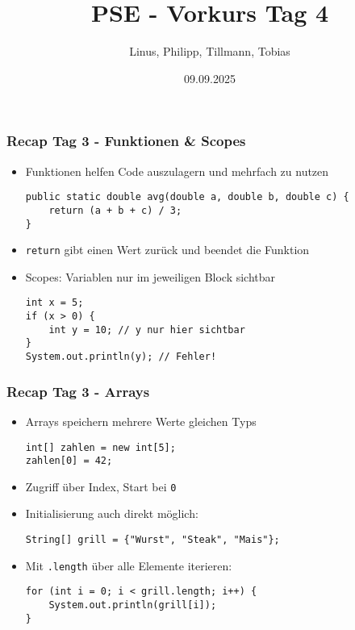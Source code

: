 \documentclass{../../presentation}
\title{PSE - Vorkurs Tag 4}
\author{Linus, Philipp, Tillmann, Tobias}
\institute{FIUS - Fachgruppe Informatik Universität Stuttgart}
\date{09.09.2025}
\begin{document}
\begin{frame}
	\titlepage
\end{frame}

\begin{frame}[fragile]
	\frametitle{Recap Tag 3 - Funktionen \& Scopes}

	\begin{itemize}
		\item\pause Funktionen helfen Code auszulagern und mehrfach zu nutzen
		      \begin{verbatim}
public static double avg(double a, double b, double c) {
    return (a + b + c) / 3;
}
          \end{verbatim}
		\item\pause \texttt{return} gibt einen Wert zurück und beendet die Funktion
		\item\pause Scopes: Variablen nur im jeweiligen Block sichtbar
		      \begin{verbatim}
int x = 5;
if (x > 0) {
    int y = 10; // y nur hier sichtbar
}
System.out.println(y); // Fehler!
          \end{verbatim}
	\end{itemize}
\end{frame}

\begin{frame}[fragile]
	\frametitle{Recap Tag 3 - Arrays}
	\pause
	\begin{itemize}
		\item\pause Arrays speichern mehrere Werte gleichen Typs
		      \begin{verbatim}
int[] zahlen = new int[5];
zahlen[0] = 42;
          \end{verbatim}
		\item\pause Zugriff über Index, Start bei \texttt{0}
		\item\pause Initialisierung auch direkt möglich:
		      \begin{verbatim}
String[] grill = {"Wurst", "Steak", "Mais"};
          \end{verbatim}
		\item Mit \texttt{.length} über alle Elemente iterieren:
		      \begin{verbatim}
for (int i = 0; i < grill.length; i++) {
    System.out.println(grill[i]);
}
          \end{verbatim}
	\end{itemize}
\end{frame}
\end{document}
